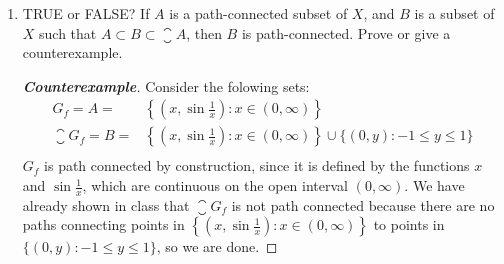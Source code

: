 \documentclass[letterpaper]{article}
\begin{document}
\begin{enumerate}
\item TRUE or FALSE? If $A$ is a path-connected subset of $X$, and $B$ is a subset of $X$ such that $A\subset B\subset \closure{A}$, then $B$ is path-connected. Prove or give a counterexample. 
\begin{proof}[\textbf{Counterexample}] Consider the folowing sets:
\[\begin{array}{rl}
G_f=A=&\left\lbrace\left(x,\sin \tfrac{1}{x}\right) : x \in (0,\infty)\right\rbrace\\
\closure{G_f}=B=&\left\lbrace\left(x,\sin \tfrac{1}{x}\right) : x \in (0,\infty)\right\rbrace \cup \{(0,y) : -1\leq y\leq 1 \}\\
\end{array}\]
$G_f$ is path connected by construction, since it is defined by the functions $x$ and $\sin \tfrac{1}{x}$, which are continuous on the open interval $(0,\infty)$. We have already shown in class that $\closure{G_f}$ is not path connected because there are no paths connecting points in $\left\lbrace\left(x,\sin \tfrac{1}{x}\right) : x \in (0,\infty)\right\rbrace$ to points in $\{(0,y) : -1\leq y\leq 1 \}$, so we are done.
\end{proof}

\end{enumerate}
\end{document}
